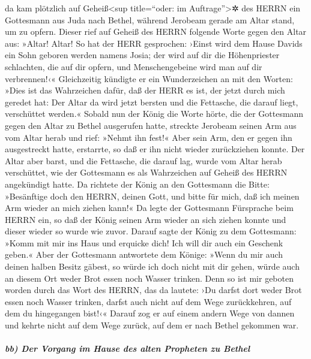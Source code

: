 da kam plötzlich auf Geheiß\textless sup title=``oder: im
Auftrage''\textgreater✲ des HERRN ein Gottesmann aus Juda nach Bethel,
während Jerobeam gerade am Altar stand, um zu opfern.
Dieser rief auf Geheiß des HERRN folgende Worte gegen den
Altar aus: »Altar! Altar! So hat der HERR gesprochen: ›Einst wird dem
Hause Davids ein Sohn geboren werden namens Josia; der wird auf dir die
Höhenpriester schlachten, die auf dir opfern, und Menschengebeine wird
man auf dir verbrennen!‹« Gleichzeitig kündigte er ein
Wunderzeichen an mit den Worten: »Dies ist das Wahrzeichen dafür, daß
der HERR es ist, der jetzt durch mich geredet hat: Der Altar da wird
jetzt bersten und die Fettasche, die darauf liegt, verschüttet werden.«
Sobald nun der König die Worte hörte, die der Gottesmann
gegen den Altar zu Bethel ausgerufen hatte, streckte Jerobeam seinen Arm
aus vom Altar herab und rief: »Nehmt ihn fest!« Aber sein Arm, den er
gegen ihn ausgestreckt hatte, erstarrte, so daß er ihn nicht wieder
zurückziehen konnte. Der Altar aber barst, und die
Fettasche, die darauf lag, wurde vom Altar herab verschüttet, wie der
Gottesmann es als Wahrzeichen auf Geheiß des HERRN angekündigt hatte.
Da richtete der König an den Gottesmann die Bitte:
»Besänftige doch den HERRN, deinen Gott, und bitte für mich, daß ich
meinen Arm wieder an mich ziehen kann!« Da legte der Gottesmann
Fürsprache beim HERRN ein, so daß der König seinen Arm wieder an sich
ziehen konnte und dieser wieder so wurde wie zuvor. Darauf
sagte der König zu dem Gottesmann: »Komm mit mir ins Haus und erquicke
dich! Ich will dir auch ein Geschenk geben.« Aber der
Gottesmann antwortete dem Könige: »Wenn du mir auch deinen halben Besitz
gäbest, so würde ich doch nicht mit dir gehen, würde auch an diesem Ort
weder Brot essen noch Wasser trinken. Denn so ist mir
geboten worden durch das Wort des HERRN, das da lautete: ›Du darfst dort
weder Brot essen noch Wasser trinken, darfst auch nicht auf dem Wege
zurückkehren, auf dem du hingegangen bist!‹« Darauf zog
er auf einem andern Wege von dannen und kehrte nicht auf dem Wege
zurück, auf dem er nach Bethel gekommen war.

\hypertarget{bb-der-vorgang-im-hause-des-alten-propheten-zu-bethel}{%
\subparagraph{bb) Der Vorgang im Hause des alten Propheten zu
Bethel}\label{bb-der-vorgang-im-hause-des-alten-propheten-zu-bethel}}

